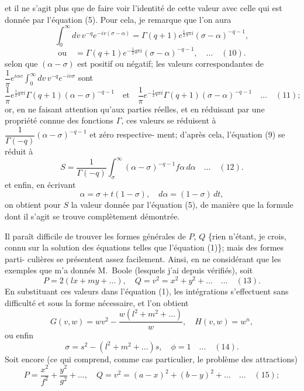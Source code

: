 \documentclass[11pt]{article}
\begin{document}

et il ne s'agit plus que de faire voir l'identit\'e de cette valeur avec celle qui est
donn\'ee par l'\'equation (5). Pour cela, je remarque que l'on aura
\[
\int_{0}^{\infty}dv\,v^{-q}e^{-iv(\sigma - \alpha)} = \Gamma(q + 1)e^{\frac{1}{2}q\pi i}(\sigma - \alpha)^{-q - 1},
\]
\[
\text{ou}\quad = \Gamma(q + 1)e^{-\frac{1}{2}q\pi i}(\sigma - \alpha)^{-q - 1},\quad\ldots\quad (10).
\]
selon que $(\alpha - \sigma)$ est positif ou n\'egatif; les valeurs correspondantes de $\dfrac{1}{\pi}e^{i\alpha v}\!\!\int_{0}^{\infty}\!dv\,v^{-q}e^{-iv\sigma}$
sont
\[
\frac{1}{\pi}e^{\frac{1}{2}q\pi i}\Gamma(q + 1)(\alpha - \sigma)^{-q - 1}\quad\text{et}\quad \frac{1}{\pi}e^{-\frac{1}{2}q\pi i}\Gamma(q + 1)(\sigma - \alpha)^{-q - 1}\quad\ldots\quad (11);
\]
or, en ne faisant attention qu'aux parties r\'eelles, et en r\'eduisant par une propri\'et\'e
connue des fonctions $\Gamma$, ces valeurs se r\'eduisent \`a $\dfrac{1}{\Gamma(-q)}(\alpha - \sigma)^{-q - 1}$ et z\'ero respective-
ment; d'apr\`es cela, l'\'equation (9) se r\'eduit \`a
\[
S = \frac{1}{\Gamma(-q)}\int_{\sigma}^{\infty}(\alpha - \sigma)^{-q - 1}f\alpha\,d\alpha\quad\ldots\quad (12).
\]
et enfin, en \'ecrivant
\[
\alpha = \sigma + t(1 - \sigma),\quad d\alpha = (1 - \sigma)\,dt,
\]
on obtient pour $S$ la valeur donn\'ee par l'\'equation (5), de mani\`ere que la formule dont
il s'agit se trouve compl\`etement d\'emontr\'ee.

\medskip
Il para\^it difficile de trouver les formes g\'en\'erales de $P$, $Q$ \{rien n'\'etant, je crois,
connu sur la solution des \'equations telles que l'\'equation (1)\}; mais des formes parti-
culi\`eres se pr\'esentent assez facilement. Ainsi, en ne consid\'erant que les exemples que
m'a donn\'es M.~Boole (lesquels j'ai depuis v\'erifi\'es), soit
\[
P = 2(lx + my + \ldots),\quad Q = v^{2} = x^{2} + y^{2} + \ldots\quad\ldots\quad (13).
\]
En substituant ces valeurs dans l'\'equation (1), les int\'egrations s'effectuent sans difficult\'e
et sous la forme n\'ecessaire, et l'on obtient
\[
G(v, w) = wv^{2} - \frac{w(l^{2} + m^{2} + \ldots)}{w},\quad H(v, w) = w^{n},
\]
ou enfin
\[
\sigma = s^{2} - (l^{2} + m^{2} + \ldots)s,\quad \phi = 1\quad\ldots\quad (14).
\]
Soit encore (ce qui comprend, comme cas particulier, le probl\`eme des attractions)
\[
P = \frac{x^{2}}{f^{2}} + \frac{y^{2}}{g^{2}} + \ldots,\quad Q = v^{2} = (a - x)^{2} + (b - y)^{2} + \ldots\quad\ldots\quad (15);
\]
\end{document}
